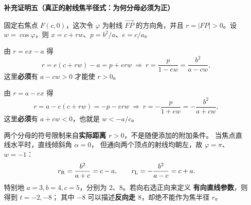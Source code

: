 \clearpage
\begin{proofbox}
  \textbf{\textcolor{CProof}{补充证明五（真正的射线焦半径式：为何分母必须为正）}}

  固定右焦点 $F(c,0)$，这次令 $\varphi$ 为射线 $\overrightarrow{FP}$
  的方向角，并且 $r=|FP|>0$。设 $w=\cos\varphi$，则
  $x=c+rw$、$p=b^2/a$、$e=c/a$。

  \begin{description}[style=nextline,leftmargin=2.8em,labelsep=0.5em,itemsep=0.35em]
    \item[\textbf{右支点：}]由 $r=ex-a$ 得
    \[
      r=e(c+rw)-a=p+erw
      \ \Longrightarrow\ 
      \boxed{r=\frac{p}{1-ew}=\frac{b^2}{a-cw}},
    \]
    这里\textbf{必须}有 $a-cw>0$ 才能使 $r>0$。
    \item[\textbf{左支点：}]由 $r=a-ex$ 得
    \[
      r=a-e(c+rw)=-p-erw
      \ \Longrightarrow\ 
      \boxed{r=-\frac{p}{1+ew}=-\frac{b^2}{a+cw}},
    \]
    这里\textbf{必须}有 $a+cw<0$，也就是 $w<-a/c$。
  \end{description}
  两个分母的符号限制来自\textbf{实际距离 $r>0$}，不是随便添加的附加条件。
  当焦点直线水平时，直线倾斜角 $\alpha=0$，
  但通向两个顶点的射线均朝左，故 $\varphi=\pi$、$w=-1$：
  \[
    r_{\rm R}=\frac{b^2}{a+c}=c-a,\qquad
    r_{\rm L}=-\frac{b^2}{a-c}=c+a.
  \]
  特别地 $a=3,b=4,c=5$，分别为 $2$、$8$。若向右选正向来定义
  \textbf{有向直线参数}，则得到 $t=-2,-8$；
  其中 $-8$ 可以描述\textbf{反向走 $8$}，却绝不能作为焦半径 $r$。
\end{proofbox}

